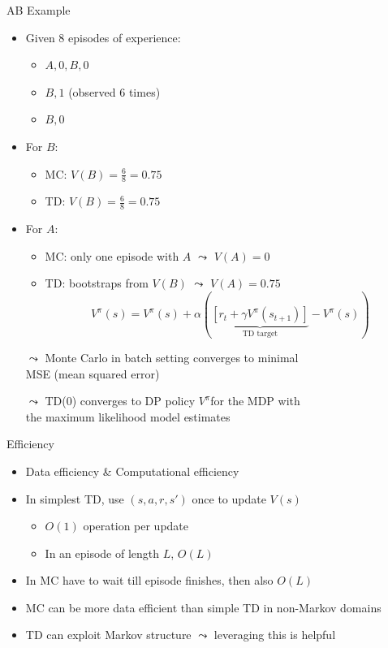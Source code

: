 \begin{frame}[c]{AB Example }
	
\begin{itemize}
	\item Given $8$ episodes of experience:
	\begin{itemize}
		\item $A, 0, B, 0$
		\item $B, 1$ (observed $6$ times)
		\item $B, 0$ 
	\end{itemize}
	\item For $B$:
	\begin{itemize}
		\item MC: $V(B) = \frac{6}{8} =  0.75$
		\item TD: $V(B) = \frac{6}{8} =  0.75$
	\end{itemize} 
	\pause
	\item For $A$:
	\begin{itemize}
		\item MC: only one episode with $A$ $\leadsto$ $V(A) = 0$ 
		\item TD: bootstraps from $V(B)$ $\leadsto$ $V(A) = 0.75$
$$ V^\pi(s) = V^\pi(s) + \alpha (\underbrace{[r_t + \gamma V^\pi (s_{t+1})]}_{\text{TD target}} - V^\pi(s))$$
	\end{itemize}	
	\medskip
	\item[$\leadsto$] Monte Carlo in batch setting converges to minimal\\ \alert{MSE} (mean squared error)
	\item[$\leadsto$] TD(0) converges to DP policy $V^\pi$for the MDP with\\ the \alert{maximum likelihood model estimates}
	
\end{itemize}
	
\end{frame}
\begin{frame}[c]{Efficiency}
	
	\begin{itemize}
		\item Data efficiency \& Computational efficiency
		\item In simplest TD, use $(s,a,r,s')$ once to update $V(s)$
		\begin{itemize}
			\item $O(1)$ operation per update
			\item In an episode of length $L$, $O(L)$
		\end{itemize}		
		\item In MC have to wait till episode finishes, then also $O(L)$
		\item MC can be more data efficient than simple TD in non-Markov domains
		\item TD can exploit Markov structure $\leadsto$ leveraging this is helpful
	\end{itemize}
	
\end{frame}
